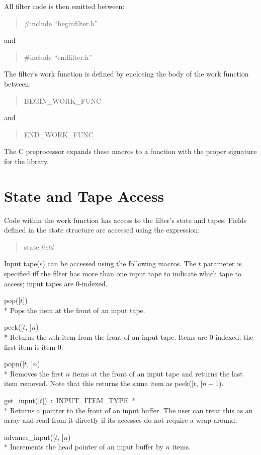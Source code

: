 All filter code is then emitted between:
\begin{quote}
\textsf{\#include ``beginfilter.h''}
\end{quote}
and
\begin{quote}
\textsf{\#include ``endfilter.h''}
\end{quote}

The filter's work function is defined by enclosing the body of the work function between:
\begin{quote}
\textsf{BEGIN\_WORK\_FUNC}
\end{quote}
and
\begin{quote}
\textsf{END\_WORK\_FUNC}
\end{quote}
The C preprocessor expands these macros to a function with the proper signature for the library.

\section{State and Tape Access}

Code within the work function has access to the filter's state and tapes. Fields defined in the state structure are accessed using the expression:
\begin{quote}
\textsf{state.\emph{field}}
\end{quote}

Input tape(s) can be accessed using the following macros. The $t$ parameter is specified iff the filter has more than one input tape to indicate which tape to access; input tapes are 0-indexed.
\begin{description}
\item \textsf{pop([$t$])} \\*
Pops the item at the front of an input tape.
\item \textsf{peek([$t$, ]$n$)} \\*
Returns the $n$th item from the front of an input tape. Items are 0-indexed; the first item is item 0.
\item \textsf{popn([$t$, ]$n$)} \\*
Removes the first $n$ items at the front of an input tape and returns the last item removed. Note that this returns the same item as \textsf{peek([$t$, ]$n - 1$)}.
\item \textsf{get\_input([$t$])~:~INPUT\_ITEM\_TYPE~*} \\*
Returns a pointer to the front of an input buffer. The user can treat this as an array and read from it directly if its accesses do not require a wrap-around.
\item \textsf{advance\_input([$t$, ]$n$)} \\*
Increments the head pointer of an input buffer by $n$ items.
\end{description}

